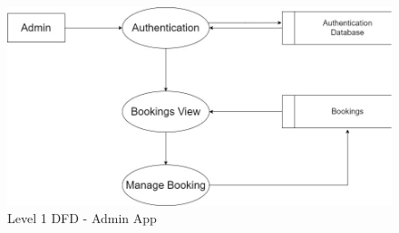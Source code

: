 \documentclass[12pt,a4paper]{report}
\begin{document}
\begin{figure}[h]
    \centering
    \includegraphics[width=\textwidth]{assets/DFD-2-Admin.jpg}
    \caption{Level 1 DFD - Admin App}
    \label{dfd-2-admin}
\end{figure}
\end{document}
